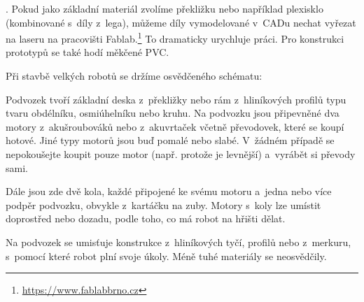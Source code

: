 .  
 Pokud jako základní materiál zvolíme překližku nebo například plexisklo (kombinované s~díly z~lega),
  můžeme díly vymodelované v~CADu nechat vyřezat na laseru na pracovišti Fablab.\footnote{\url{https://www.fablabbrno.cz}} 
  To dramaticky urychluje práci.    
 Pro konstrukci prototypů se také hodí měkčené PVC.  

 Při stavbě velkých robotů se držíme osvědčeného schématu: 

  Podvozek tvoří základní deska z~překližky nebo rám z~hliníkových profilů typu  tvaru obdélníku, osmiúhelníku nebo kruhu. 
   Na podvozku jsou  připevněné dva motory z~akušroubováků nebo z~akuvrtaček včetně převodovek, které se koupí hotové. 
   Jiné typy motorů jsou buď pomalé nebo slabé. 
   V~žádném případě se nepokoušejte koupit pouze motor (např. protože je levnější) a~vyrábět si převody sami.  
 
 Dále jsou zde dvě kola, každé připojené ke svému motoru a~jedna nebo více podpěr podvozku, 
 obvykle z~kartáčku na zuby.
  Motory s~koly lze umístit doprostřed nebo dozadu, podle toho, co má robot na hřišti dělat. 
 
 Na podvozek se umisťuje konstrukce z~hliníkových tyčí, profilů nebo z~merkuru, s~pomocí které robot plní svoje úkoly. 
 Méně tuhé materiály se neosvědčily.    
 

  
